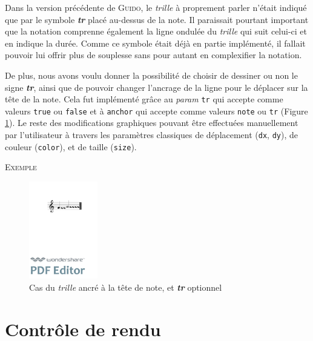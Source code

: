 \documentclass{article}
\newenvironment{gmncode}	{\vspace{-2mm}\small\verbatim}{\endverbatim\vspace{-2mm}}
\newcommand{\guido}			{\textsc{Guido}}
\newcommand{\code}[1]		{{\small \texttt{#1}}}
\newcommand{\exemple}		{\vspace{2mm}\hspace*{-6mm}\textsc{Exemple}}
\begin{document}
Dans la version précédente de \guido{}, le \emph{trille} à proprement parler n'était indiqué que par le symbole \textit{\textbf{tr}} placé au-dessus de la note. Il paraissait pourtant important que la notation comprenne également la ligne ondulée du \emph{trille} qui suit celui-ci et en indique la durée. Comme ce symbole était déjà en partie implémenté, il fallait pouvoir lui offrir plus de souplesse sans pour autant en complexifier la notation.


De plus, nous avons voulu donner la possibilité de choisir de dessiner ou non le signe \textit{\textbf{tr}}, ainsi que de pouvoir changer l'ancrage de la ligne pour le déplacer sur la tête de la note. Cela fut implémenté grâce au \emph{param} \code{tr} qui accepte comme valeurs \code{true} ou \code{false} et à \code{anchor} qui accepte comme valeurs \code{note} ou \code{tr} (Figure \ref{fig:trillanchor}). Le reste des modifications graphiques pouvant être effectuées manuellement par l'utilisateur à travers les paramètres classiques de déplacement (\code{dx}, \code{dy}), de couleur (\code{color}), et de taille (\code{size}).

\exemple
\begin{figure}[h]
\centering
\begin{gmncode}
[ \trill<tr="false", anchor="note">
( {g} {a/2} ) ]
\end{gmncode}
\includegraphics[width=30mm]{img/trillanchor.pdf}
\caption{Cas du \emph{trille} ancré à la tête de note, et \textit{\textbf{tr}} optionnel}
\label{fig:trillanchor}
\end{figure}


\section{Contr\^ole de rendu}\label{sec:controleRendu}
\end{document}
